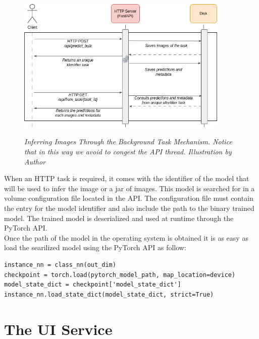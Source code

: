 \begin{figure}[H]
\centering
\includegraphics[width=0.9\textwidth]{imatges/preliminaries/BackgroundTask.drawio.png}
\caption[Inferring Images Through the Background Task Mechanism]{\textit{Inferring Images Through the Background Task Mechanism. Notice that in this way we avoid to congest the API thread. Illustration by Author}}
{\label{fig:backgrond-task}}
\end{figure}

When an HTTP task is required, it comes with the identifier of the model that will be used to infer the image or a jar of images. This model is searched for in a volume configuration file located in the API. The configuration file must contain the entry for the model identifier and also include the path to the binary trained model. The trained model is deserialized and used at runtime through the PyTorch API. \\

Once the path of the model in the operating system is obtained it is as easy as load the searilized model
using the PyTorch API as follow:

\begin{Verbatim}[fontsize=\scriptsize]
instance_nn = class_nn(out_dim)
checkpoint = torch.load(pytorch_model_path, map_location=device)
model_state_dict = checkpoint['model_state_dict']
instance_nn.load_state_dict(model_state_dict, strict=True)
\end{Verbatim}



\section{The UI Service}
